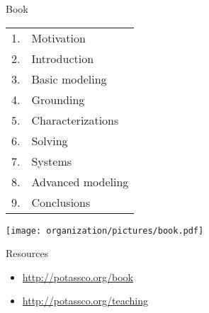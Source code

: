\begin{frame}[c]{ Book}
  \bigskip
  \qquad\small
  \begin{tabular}[b]{rl}
    {1.}&{Motivation}\\
    {2.}&{Introduction}\\
    {3.}&{Basic modeling}\\
    {4.}&{Grounding}\\
    {5.}&{Characterizations}\\
    {6.}&{Solving}\\
    {7.}&{Systems}\\
    {8.}&{Advanced modeling}\\
    {9.}&{Conclusions}
  \end{tabular}
  \hfill
  \colorbox{white}{%
                           {\texttt{[image: organization/pictures/book.pdf]}}}
  \hfill\qquad
  \pause[3]

  \bigskip

  \begin{block}{Resources}
    \vspace{-2ex}
    \begin{itemize}\itemsep 0pt
    \item \url{http://potassco.org/book}
    \item \url{http://potassco.org/teaching}
    \end{itemize}
    \vspace{-2ex}
  \end{block}
\end{frame}
%
